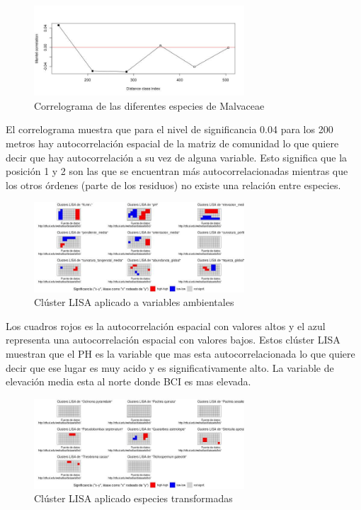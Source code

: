 \documentclass[11pt,]{article}
\begin{document}
\begin{figure}
\centering
\includegraphics[width=0.70000\textwidth]{mi_fam_correlograma.jpg}
\caption{Correlograma de las diferentes especies de Malvaceae}
\end{figure}

El correlograma muestra que para el nivel de significancia 0.04 para los
200 metros hay autocorrelación espacial de la matriz de comunidad lo que
quiere decir que hay autocorrelación a su vez de alguna variable. Esto
significa que la posición 1 y 2 son las que se encuentran más
autocorrelacionadas mientras que los otros órdenes (parte de los
residuos) no existe una relación entre especies.

\begin{figure}
\centering
\includegraphics[width=0.70000\textwidth]{cluster_LISA.jpg}
\caption{Clúster LISA aplicado a variables ambientales}
\end{figure}

Los cuadros rojos es la autocorrelación espacial con valores altos y el
azul representa una autocorrelación espacial con valores bajos. Estos
clúster LISA muestran que el PH es la variable que mas esta
autocorrelacionada lo que quiere decir que ese lugar es muy acido y es
significativamente alto. La variable de elevación media esta al norte
donde BCI es mas elevada.

\begin{figure}
\centering
\includegraphics[width=0.70000\textwidth]{cluster_LISA_aplicado_especies_transformadas.jpg}
\caption{Clúster LISA aplicado especies transformadas}
\end{figure}
\end{document}
